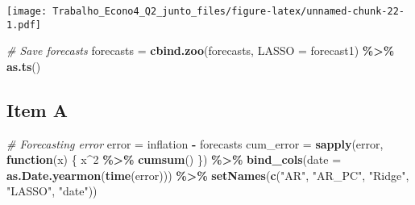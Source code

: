 \documentclass[
]{article}
\newenvironment{Shaded}{\begin{snugshade}}{\end{snugshade}}
\newcommand{\AttributeTok}[1]{\textcolor[rgb]{0.13,0.29,0.53}{#1}}
\newcommand{\CommentTok}[1]{\textcolor[rgb]{0.56,0.35,0.01}{\textit{#1}}}
\newcommand{\ControlFlowTok}[1]{\textcolor[rgb]{0.13,0.29,0.53}{\textbf{#1}}}
\newcommand{\DecValTok}[1]{\textcolor[rgb]{0.00,0.00,0.81}{#1}}
\newcommand{\FunctionTok}[1]{\textcolor[rgb]{0.13,0.29,0.53}{\textbf{#1}}}
\newcommand{\NormalTok}[1]{#1}
\newcommand{\OtherTok}[1]{\textcolor[rgb]{0.56,0.35,0.01}{#1}}
\newcommand{\SpecialCharTok}[1]{\textcolor[rgb]{0.81,0.36,0.00}{\textbf{#1}}}
\newcommand{\StringTok}[1]{\textcolor[rgb]{0.31,0.60,0.02}{#1}}
\begin{document}
\begin{Shaded}
\end{Shaded}

\texttt{[image: Trabalho\_Econo4\_Q2\_junto\_files/figure-latex/unnamed-chunk-22-1.pdf]}

\begin{Shaded}
\begin{Highlighting}[]
\CommentTok{\# Save forecasts}
\NormalTok{forecasts }\OtherTok{=} \FunctionTok{cbind.zoo}\NormalTok{(forecasts, }\AttributeTok{LASSO =}\NormalTok{ forecast1) }\SpecialCharTok{\%\textgreater{}\%}
    \FunctionTok{as.ts}\NormalTok{()}
\end{Highlighting}
\end{Shaded}

\hypertarget{item-a}{%
\subsection{Item A}\label{item-a}}

\begin{Shaded}
\begin{Highlighting}[]
\CommentTok{\# Forecasting error}
\NormalTok{error }\OtherTok{=}\NormalTok{ inflation }\SpecialCharTok{{-}}\NormalTok{ forecasts}
\NormalTok{cum\_error }\OtherTok{=} \FunctionTok{sapply}\NormalTok{(error, }\ControlFlowTok{function}\NormalTok{(x) \{}
\NormalTok{    x}\SpecialCharTok{\^{}}\DecValTok{2} \SpecialCharTok{\%\textgreater{}\%}
        \FunctionTok{cumsum}\NormalTok{()}
\NormalTok{\}) }\SpecialCharTok{\%\textgreater{}\%}
    \FunctionTok{bind\_cols}\NormalTok{(}\AttributeTok{date =} \FunctionTok{as.Date.yearmon}\NormalTok{(}\FunctionTok{time}\NormalTok{(error))) }\SpecialCharTok{\%\textgreater{}\%}
    \FunctionTok{setNames}\NormalTok{(}\FunctionTok{c}\NormalTok{(}\StringTok{"AR"}\NormalTok{, }\StringTok{"AR\_PC"}\NormalTok{, }\StringTok{"Ridge"}\NormalTok{, }\StringTok{"LASSO"}\NormalTok{, }\StringTok{"date"}\NormalTok{))}
\end{Highlighting}
\end{Shaded}
\end{document}
